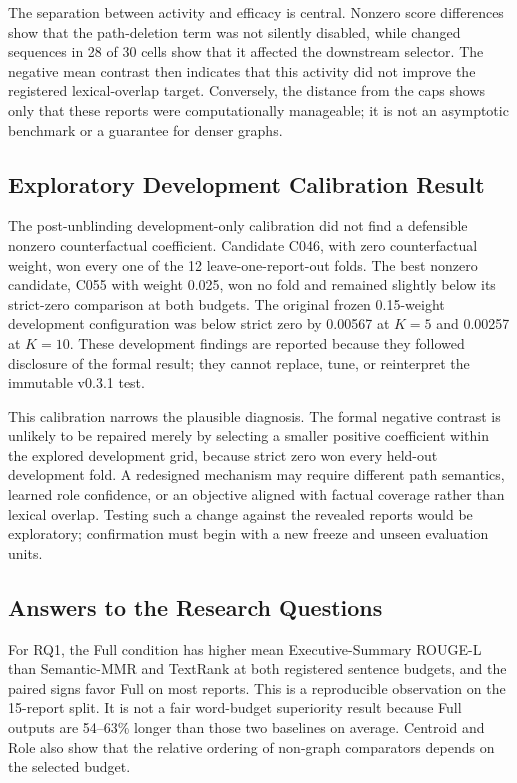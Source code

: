 \documentclass[applsci,article,submit,moreauthors]{Definitions/mdpi}
\begin{document}
The separation between activity and efficacy is central. Nonzero score differences show that the path-deletion term was not silently disabled, while changed sequences in 28 of 30 cells show that it affected the downstream selector. The negative mean contrast then indicates that this activity did not improve the registered lexical-overlap target. Conversely, the distance from the caps shows only that these reports were computationally manageable; it is not an asymptotic benchmark or a guarantee for denser graphs.

\subsection{Exploratory Development Calibration Result}

The post-unblinding development-only calibration did not find a defensible nonzero counterfactual coefficient. Candidate C046, with zero counterfactual weight, won every one of the 12 leave-one-report-out folds. The best nonzero candidate, C055 with weight 0.025, won no fold and remained slightly below its strict-zero comparison at both budgets. The original frozen 0.15-weight development configuration was below strict zero by 0.00567 at $K=5$ and 0.00257 at $K=10$. These development findings are reported because they followed disclosure of the formal result; they cannot replace, tune, or reinterpret the immutable v0.3.1 test.

This calibration narrows the plausible diagnosis. The formal negative contrast is unlikely to be repaired merely by selecting a smaller positive coefficient within the explored development grid, because strict zero won every held-out development fold. A redesigned mechanism may require different path semantics, learned role confidence, or an objective aligned with factual coverage rather than lexical overlap. Testing such a change against the revealed reports would be exploratory; confirmation must begin with a new freeze and unseen evaluation units.

\subsection{Answers to the Research Questions}

For RQ1, the Full condition has higher mean Executive-Summary ROUGE-L than Semantic-MMR and TextRank at both registered sentence budgets, and the paired signs favor Full on most reports. This is a reproducible observation on the 15-report split. It is not a fair word-budget superiority result because Full outputs are 54--63\% longer than those two baselines on average. Centroid and Role also show that the relative ordering of non-graph comparators depends on the selected budget.
\end{document}
